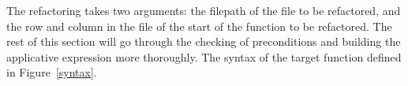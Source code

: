The refactoring takes two arguments: the filepath of the file to be refactored, and the row and column in the file of the start of the function to be refactored. The rest of this section will go through the checking of preconditions and building the applicative expression more thoroughly. The syntax of the target function \DIFdelbegin {}\DIFdelend \DIFaddbegin {}\DIFaddend defined in Figure~\ref{syntax}.



\DIFdelbegin \subsubsection{}
\addtocounter{subsubsection}{-1}%
\DIFdelend \DIFaddbegin \subsection{}
\DIFaddend 

